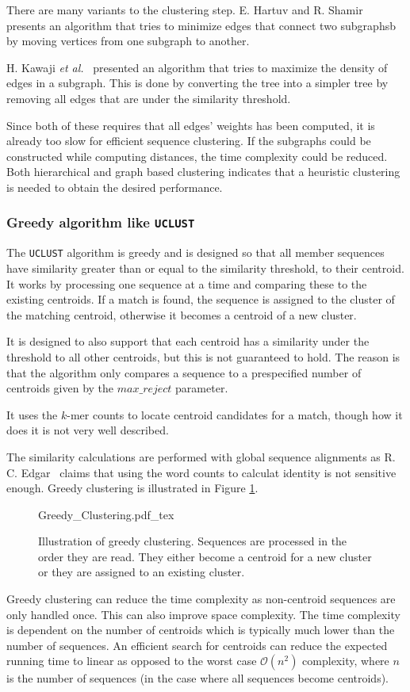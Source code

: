 There are many variants to the clustering step. E. Hartuv and R.
Shamir~\cite{hartuv} presents an algorithm that tries to minimize edges that
connect two subgraphsb by moving vertices from one subgraph to another.

H. Kawaji \textit{et al.}~\cite{kawaji} presented an algorithm that tries to
maximize the density of edges in a subgraph. This is done by converting the
tree into a simpler tree by removing all edges that are under the similarity
threshold.

Since both of these requires that all edges' weights has been computed, it is
already too slow for efficient sequence clustering. If the subgraphs could be
constructed while computing distances, the time complexity could be reduced.
Both hierarchical and graph based clustering indicates that a heuristic
clustering is needed to obtain the desired performance.


\subsubsection{Greedy algorithm like \texttt{UCLUST}}

The \texttt{UCLUST} algorithm is greedy and is designed so that all member
sequences have similarity greater than or equal to the similarity threshold,
to their centroid.  It works by processing one sequence at a time and
comparing these to the existing centroids. If a match is found, the sequence
is assigned to the cluster of the matching centroid, otherwise it becomes a
centroid of a new cluster.

It is designed to also support that each centroid has a similarity under the
threshold to all other centroids, but this is not guaranteed to hold. The
reason is that the algorithm only compares a sequence to a prespecified number
of centroids given by the $max\_reject$ parameter.

It uses the $k$-mer counts to locate centroid candidates for a match, though
how it does it is not very well described.

The similarity calculations are performed with global sequence alignments as R. C. Edgar~\cite{usearch_algorithm}  claims that using the word counts to calculat
identity is not sensitive enough. Greedy clustering is illustrated in Figure
\ref{fig:greedy_clustering}.

\begin{figure}[H]
  \def\svgwidth{\columnwidth}
  {Greedy_Clustering.pdf_tex}
  \caption{Illustration of greedy clustering. Sequences are processed in the
    order they are read. They either become a centroid for a new cluster or
    they are assigned to an existing cluster.}
  \label{fig:greedy_clustering}
\end{figure}

Greedy clustering can reduce the time complexity as non-centroid sequences are
only handled once. This can also improve space complexity. The time complexity
is dependent on the number of centroids which is typically much lower than the
number of sequences. An efficient search for centroids can reduce the expected
running time to linear as opposed to the worst case $\mathcal{O}(n^2)$
complexity, where $n$ is the number of sequences (in the case where all
sequences become centroids).
